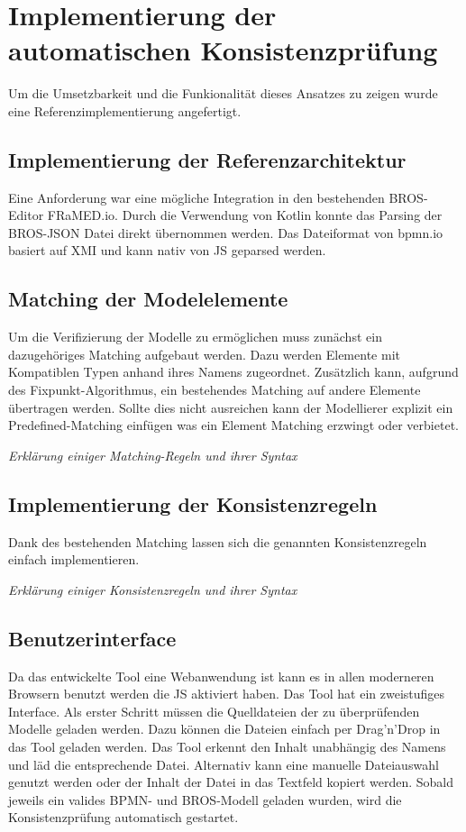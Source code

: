 \chapter{Implementierung der automatischen Konsistenzprüfung}

Um die Umsetzbarkeit und die Funkionalität dieses Ansatzes zu zeigen wurde eine Referenzimplementierung angefertigt. 

\section{Implementierung der Referenzarchitektur}

Eine Anforderung war eine mögliche Integration in den bestehenden BROS-Editor FRaMED.io.
Durch die Verwendung von Kotlin konnte das Parsing der BROS-JSON Datei direkt übernommen werden.
Das Dateiformat von bpmn.io basiert auf XMI und kann nativ von JS geparsed werden.

\section{Matching der Modelelemente}

Um die Verifizierung der Modelle zu ermöglichen muss zunächst ein dazugehöriges Matching aufgebaut werden.
Dazu werden Elemente mit Kompatiblen Typen anhand ihres Namens zugeordnet.
Zusätzlich kann, aufgrund des Fixpunkt-Algorithmus, ein bestehendes Matching auf andere Elemente übertragen werden.
Sollte dies nicht ausreichen kann der Modellierer explizit ein Predefined-Matching einfügen was ein Element Matching erzwingt oder verbietet.

\textit{Erklärung einiger Matching-Regeln und ihrer Syntax}

\section{Implementierung der Konsistenzregeln}

Dank des bestehenden Matching lassen sich die genannten Konsistenzregeln einfach implementieren.

\textit{Erklärung einiger Konsistenzregeln und ihrer Syntax}

\section{Benutzerinterface}

Da das entwickelte Tool eine Webanwendung ist kann es in allen moderneren Browsern benutzt werden die JS aktiviert haben.
Das Tool hat ein zweistufiges Interface.
Als erster Schritt müssen die Quelldateien der zu überprüfenden Modelle geladen werden.
Dazu können die Dateien einfach per Drag'n'Drop in das Tool geladen werden.
Das Tool erkennt den Inhalt unabhängig des Namens und läd die entsprechende Datei.
Alternativ kann eine manuelle Dateiauswahl genutzt werden oder der Inhalt der Datei in das Textfeld kopiert werden.
Sobald jeweils ein valides BPMN- und BROS-Modell geladen wurden, wird die Konsistenzprüfung automatisch gestartet.

